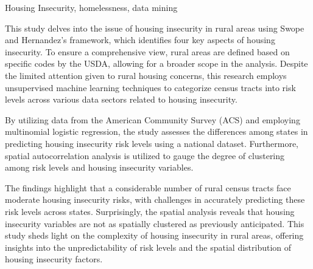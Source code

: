 
\begin{abstract}
This paper explores rural housing insecurity through Swope and Hernandez’s (2019) 4 C's of housing insecurity in rural areas. Rural census tracts are defined by the United States Department of Agriculture (USDA) Rural Urban Code Continuum (RUCA) codes seven through ten to avoid an overly restrictive definition.  Little attention has been paid to rural areas in the conversation on housing, to facilitate further discussion this exploratory study uses unsupervised machine learning to group census tracts into risk levels across 7 sectors of ACS data based on housing insecurity factors found in the literature. Multinomial logistic regression is used to determine variation between states based on how well state risk levels can be predicted with the national dataset. Additionally, spatial autocorrelation is used to analyze how spatially clustered the risk levels and housing insecurity risk variables.  The results indicate that many rural census tracts have a medium risk of housing insecurity, and the risk levels are hard to predict. The spatial autocorrelation results show that the housing insecurity variables are not as highly spatially clustered as expected.  
\end{abstract}

\begin{layabstract}{Housing Insecurity, homelessness, data mining}	%

This study delves into the issue of housing insecurity in rural areas using Swope and Hernandez's framework, which identifies four key aspects of housing insecurity. To ensure a comprehensive view, rural areas are defined based on specific codes by the USDA, allowing for a broader scope in the analysis. Despite the limited attention given to rural housing concerns, this research employs unsupervised machine learning techniques to categorize census tracts into risk levels across various data sectors related to housing insecurity.

By utilizing data from the American Community Survey (ACS) and employing multinomial logistic regression, the study assesses the differences among states in predicting housing insecurity risk levels using a national dataset. Furthermore, spatial autocorrelation analysis is utilized to gauge the degree of clustering among risk levels and housing insecurity variables.

The findings highlight that a considerable number of rural census tracts face moderate housing insecurity risks, with challenges in accurately predicting these risk levels across states. Surprisingly, the spatial analysis reveals that housing insecurity variables are not as spatially clustered as previously anticipated. This study sheds light on the complexity of housing insecurity in rural areas, offering insights into the unpredictability of risk levels and the spatial distribution of housing insecurity factors.

\end{layabstract}

